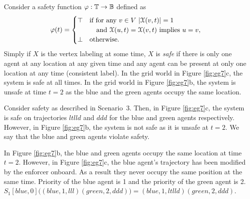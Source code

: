 \begin{eg}
\label{eg:safe}
Consider a safety function $\varphi:  \mathbb{T} \to \mathbb{B}$ defined as
\begin{align}
\varphi(t) = 
     \begin{cases}
       \top & \text{if for any } v \in V~ |\mathcal{X}(v,t)|=1 \\
       &\quad \text{and } \mathcal{X}(u,t) = \mathcal{X}(v,t) \text{ implies } u = v, \\
       \bot & \text{otherwise.} \\
    \end{cases}
\end{align}
\noindent Simply if $X$ is the vertex labeling at some time, $X$ is \emph{safe} if there is only one agent at any location at any given time and any agent can be present at only one location at any time (consistent label). 
In the grid world in Figure \ref{fig:eg7}c, the system is safe at all times. In the grid world in Figure \ref{fig:eg7}b, the system is unsafe at time $t = 2$ as the blue and the green agents occupy the same location.
\label{eg:safety_fn}
\end{eg}


\begin{eg}
Consider safety as described in Scenario~3. Then, in Figure \ref{fig:eg7}c, the system is safe on trajectories $ltlld$ and $ddd$ for the blue and green agents respectively. However, in Figure \ref{fig:eg7}b, the system is not safe as it is unsafe at $t=2$. We say that the blue and green agents violate safety.
\end{eg}



\begin{eg}
In Figure \ref{fig:eg7}b, the blue and green agents occupy the same location at time $t=2$. However, in Figure \ref{fig:eg7}c, the blue agent's trajectory has been modified by the enforcer onboard. As a result they never occupy the same position at the same time. Priority of the blue agent is 1 and the priority of the green agent is 2. $S_1[blue,0]\big((blue,1,lll)(green,2,ddd)\big) = (blue,1,ltlld)(green,2,ddd)$.
\end{eg}



